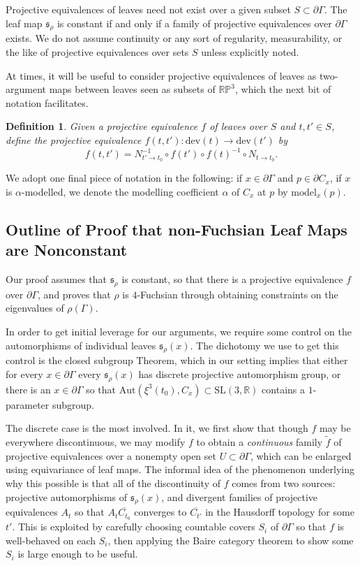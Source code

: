 \documentclass[12pt,a4paper]{amsart}
\theoremstyle{definition}
\theoremstyle{plain}
\newtheorem{definition}[theorem]{Definition}
\numberwithin{equation}{section}
\begin{document}
Projective equivalences of leaves need not exist over a given subset $S \subset \partial \Gamma$. The leaf map $\mathfrak{s}_\rho$ is constant if and only if a family of projective equivalences over $\partial \Gamma$ exists. We do not assume continuity or any sort of regularity, measurability, or the like of projective equivalences over sets $S$ unless explicitly noted.

At times, it will be useful to consider projective equivalences of leaves as two-argument maps between leaves seen as subsets of $\mathbb{RP}^3$, which the next bit of notation facilitates.

\begin{definition}
    Given a projective equivalence $f$ of leaves over $S$ and $t, t' \in S$, define the projective equivalence $f(t,t'): \text{dev}(t) \to \text{dev}(t')$ by $$f(t,t') = N_{t'\to t_0}^{-1} \circ f(t') \circ f(t)^{-1} \circ N_{t \to t_0}.$$ 
\end{definition}

We adopt one final piece of notation in the following: if $x \in \partial \Gamma$ and $p \in \partial C_x$, if $x$ is $\alpha$-modelled, we denote the modelling coefficient $\alpha$ of $C_x$ at $p$ by $\text{model}_x(p)$.

\subsection{Outline of Proof that non-Fuchsian Leaf Maps are Nonconstant}\label{outline-of-main-proof}

Our proof assumes that $\mathfrak{s}_\rho$ is constant, so that there is a projective equivalence $f$ over $\partial \Gamma$, and proves that $\rho$ is $4$-Fuchsian through obtaining constraints on the eigenvalues of $\rho(\Gamma)$.

In order to get initial leverage for our arguments, we require some control on the automorphisms of individual leaves $\mathfrak{s}_\rho(x)$. The dichotomy we use to get this control is the closed subgroup Theorem, which in our setting implies that either for every $x\in \partial \Gamma$ every $\mathfrak{s}_\rho(x)$ has discrete projective automorphism group, or there is an $x \in \partial \Gamma$ so that $\text{Aut}(\xi^3(t_0), C_x) \subset \text{SL}(3, \mathbb{R})$ contains a $1$-parameter subgroup.



The discrete case is the most involved. In it, we first show that though $f$ may be everywhere discontinuous, we may modify $f$ to obtain a \textit{continuous} family $\widetilde{f}$ of projective equivalences over a nonempty open set $U \subset \partial \Gamma$, which can be enlarged using equivariance of leaf maps. The informal idea of the phenomenon underlying why this possible is that all of the discontinuity of $f$ comes from two sources: projective automorphisms of $\mathfrak{s}_\rho(x)$, and divergent families of projective equivalences $A_t$ so that $A_t \overline{C_{t_0}}$ converges to $\overline{C_{t'}}$ in the Hausdorff topology for some $t'$. This is exploited by carefully choosing countable covers $S_i$ of $\partial \Gamma$ so that $f$ is well-behaved on each $S_i$, then applying the Baire category theorem to show some $S_i$ is large enough to be useful.
\end{document}
